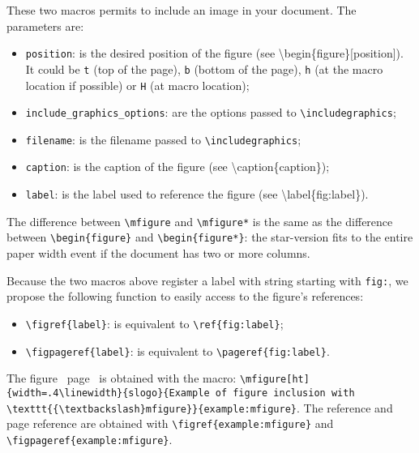 \documentclass[book]{upmethodology-document}
\begin{document}
These two macros permits to include an image in your document. The parameters are:
\begin{itemize}
\item \texttt{position}: is the desired position of the figure (see {\textbackslash}begin\{figure\}[position]). It could be \texttt{t} (top of the page), \texttt{b} (bottom of the page), \texttt{h} (at the macro location if possible) or \texttt{H} (at macro location);

\item \texttt{include\_graphics\_options}: are the options passed to \texttt{{\textbackslash}includegraphics};

\item \texttt{filename}: is the filename passed to \texttt{{\textbackslash}includegraphics};

\item \texttt{caption}: is the caption of the figure (see {\textbackslash}caption\{caption\});

\item \texttt{label}: is the label used to reference the figure (see {\textbackslash}label\{fig:label\}).
\end{itemize}

The difference between \texttt{{\textbackslash}mfigure} and \texttt{{\textbackslash}mfigure*} is the same as the difference between \texttt{{\textbackslash}begin\{figure\}} and \texttt{{\textbackslash}begin\{figure*\}}: the star-version fits to the entire paper width event if the document has two or more columns.

Because the two macros above register a label with string starting with \texttt{fig:}, we propose the following function to easily access to the figure's references:
\begin{itemize}
\item \texttt{{\textbackslash}figref\{label\}}: is equivalent to \texttt{{\textbackslash}ref\{fig:label\}};
\item \texttt{{\textbackslash}figpageref\{label\}}: is equivalent to \texttt{{\textbackslash}pageref\{fig:label\}}.
\end{itemize}

The figure~ page~ is obtained with the macro: \texttt{{\textbackslash}mfigure[ht]\{width=.4{\textbackslash}linewidth\}\{slogo\}\{Example of figure inclusion with {\textbackslash}texttt\{\{{\textbackslash}textbackslash\}mfigure\}\}\{example:mfigure\}}. The reference and page reference are obtained with \texttt{{\textbackslash}figref\{example:mfigure\}} and \texttt{{\textbackslash}figpageref\{example:mfigure\}}.
\end{document}
